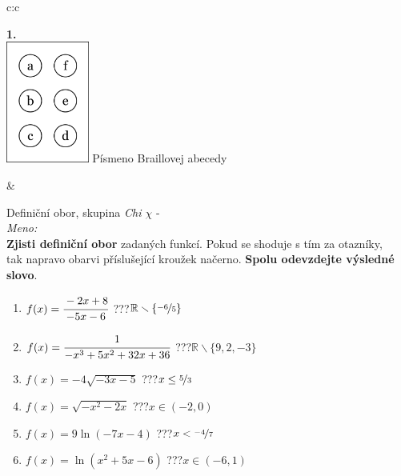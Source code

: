 \documentclass[10pt]{report}
\begin{document}
\begin{tabular}{c:c}
\begin{minipage}[c][99mm][t]{0.49\linewidth}
\begin{center}
\begin{minipage}{0.20\linewidth}
\begin{center}
{\Huge\bfseries 1.} \\[2mm]
\includegraphics[height=40mm]{../images/braille.png}
{\small Písmeno Braillovej abecedy}
\end{center}
\end{minipage}
\end{center}
\end{minipage}
&
\begin{minipage}[c][99mm][t]{0.49\linewidth}
\begin{center}
\vspace{7mm}
{\huge Definiční obor, skupina \textit{Chi $\chi$} -}\\[4.5mm]
\textit{Meno:}\phantom{xxxxxxxxxxxxxxxxxxxxxxxxxxxxxxxxxxxxxxxxxxxxxxxxxxxxxxxxxxxxxxxxx}\\[3.5mm]
\textbf{Zjisti definiční obor} zadaných funkcí. Pokud se shoduje s tím za otazníky,\\tak napravo obarvi příslušející kroužek načerno. \textbf{Spolu odevzdejte výsledné slovo}.\\[3mm]
\begin{minipage}{0.77\linewidth}
\begin{center}
\begin{varwidth}{\textwidth}
\begin{enumerate}
\normalsize
\item $f(x)=\cfrac{-2x+8}{-5x-6}$\quad \dotfill\; ???\;\dotfill \quad $\mathbb{R}\smallsetminus\{\nicefrac{-6}{5}\}$
\item $f(x)=\cfrac{1}{-x^3+5x^2+32x+36}$\quad \dotfill\; ???\;\dotfill \quad $\mathbb{R}\smallsetminus\{9,2,-3\}$
\item $f(x)=-4\sqrt{-3x-5}$\quad \dotfill\; ???\;\dotfill \quad $x\leq\nicefrac{5}{3}$
\item $f(x)=\sqrt{-x^2-2x}$\quad \dotfill\; ???\;\dotfill \quad $x\in(-2 , 0)$
\item $f(x)=9\ln{(-7x-4)}$\quad \dotfill\; ???\;\dotfill \quad $x<\nicefrac{-4}{7}$
\item $f(x)=\ln{(x^2+5x-6)}$\quad \dotfill\; ???\;\dotfill \quad $x\in(-6 , 1)$

\end{enumerate}
\end{varwidth}
\end{center}
\end{minipage}
\end{center}
\end{minipage}
\end{tabular}
\end{document}
